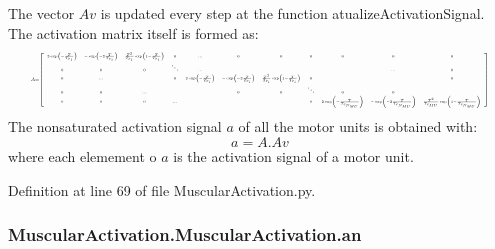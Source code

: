 The vector $Av$ is updated every step at the function atualize\+Activation\+Signal. The activation matrix itself is formed as\+: \begin{equation} \resizebox{0.95\hsize}{!}{$\scriptstyle A = \left[\begin{array}{ccccccccccc}\scriptscriptstyle 2\exp\left(-\frac{T}{T_{c_1}}\right)&\scriptscriptstyle -\exp\left(-2\frac{T}{T_{c_1}}\right)&\scriptscriptstyle \frac{T^2}{T_{c_1}}\exp\left(1-\frac{T}{T_{c_1}} \right)&\scriptscriptstyle 0&\scriptscriptstyle ...&\scriptscriptstyle 0&\scriptscriptstyle 0& \scriptscriptstyle 0&\scriptscriptstyle 0&\scriptscriptstyle 0&\scriptscriptstyle 0\\ \scriptscriptstyle 0&\scriptscriptstyle 0&\scriptscriptstyle 0&\scriptscriptstyle \ddots&\scriptscriptstyle ...&&&&&\scriptscriptstyle ...&\scriptscriptstyle 0\\ \scriptscriptstyle 0&\scriptscriptstyle ...&&\scriptscriptstyle 0&\scriptscriptstyle 2\exp\left(-\frac{T}{T_{c_i}}\right)&\scriptscriptstyle -\exp\left(-2\frac{T}{T_{c_i}}\right)&\scriptscriptstyle \frac{T^2}{T_{c_i}}\exp\left(1-\frac{T}{T_{c_i}} \right)&\scriptscriptstyle 0&&&\scriptscriptstyle 0\\ \scriptscriptstyle0&\scriptscriptstyle0&\scriptscriptstyle...&&&\scriptscriptstyle0&\scriptscriptstyle 0&\scriptscriptstyle\ddots&\scriptscriptstyle0&\scriptscriptstyle0\\ \scriptscriptstyle0&\scriptscriptstyle0&\scriptscriptstyle0&\scriptscriptstyle...&&&&\scriptscriptstyle0&\scriptscriptstyle 2\exp\left(-\frac{T}{T_{c_{N_{MU}}}}\right)&\scriptscriptstyle -\exp\left(-2\frac{T}{T_{c_{N_{MU}}}}\right)&\scriptscriptstyle \frac{T^2}{T_{c_{{MU}}}}\exp\left(1-\frac{T}{T_{c_{N_{MU}}}} \right)\end{array}\right]$} \end{equation} The nonsaturated activation signal $a$ of all the motor units is obtained with\+: \begin{equation} a = A.Av \end{equation} where each elemement o $a$ is the activation signal of a motor unit. 

Definition at line 69 of file Muscular\+Activation.\+py.

\subsubsection[{\texorpdfstring{an}{an}}]{\setlength{\rightskip}{0pt plus 5cm}Muscular\+Activation.\+Muscular\+Activation.\+an}\hypertarget{class_muscular_activation_1_1_muscular_activation_a95b93fee93d650995b077d1852bf987c}{}\label{class_muscular_activation_1_1_muscular_activation_a95b93fee93d650995b077d1852bf987c}


